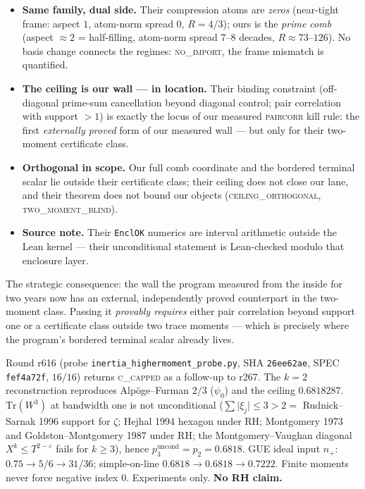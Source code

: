 \documentclass[11pt]{article}
\theoremstyle{definition}
\theoremstyle{remark}
\begin{document}
\begin{itemize}[leftmargin=2em]
\item \textbf{Same family, dual side.}  Their compression atoms are
\emph{zeros} (near-tight frame: aspect $1$, atom-norm spread $0$,
$R=4/3$); ours is the \emph{prime comb} (aspect $\approx2$ =
half-filling, atom-norm spread $7$--$8$ decades, $R\approx73$--$126$).
No basis change connects the regimes: \textsc{no\_import}, the frame
mismatch is quantified.
\item \textbf{The ceiling is our wall --- in location.}  Their binding
constraint (off-diagonal prime-sum cancellation beyond diagonal control;
pair correlation with support $>1$) is exactly the locus of our measured
\textsc{paircorr} kill rule: the first \emph{externally proved} form of
our measured wall --- but only for their two-moment certificate class.
\item \textbf{Orthogonal in scope.}  Our full comb coordinate and the
bordered terminal scalar lie outside their certificate class; their
ceiling does not close our lane, and their theorem does not bound our
objects (\textsc{ceiling\_orthogonal}, \textsc{two\_moment\_blind}).
\item \textbf{Source note.}  Their \texttt{EnclOK} numerics are interval
arithmetic outside the Lean kernel --- their unconditional statement is
Lean-checked modulo that enclosure layer.
\end{itemize}

The strategic consequence: the wall the program measured from the inside
for two years now has an external, independently proved counterpart in the
two-moment class.  Passing it \emph{provably requires} either pair
correlation beyond support one or a certificate class outside two trace
moments --- which is precisely where the program's bordered terminal
scalar already lives.

\noindent Round r616 (probe \texttt{inertia\_highermoment\_probe.py},
SHA \texttt{26ee62ae}, SPEC \texttt{fef4a72f}, $16/16$) returns
\textsc{c\_capped} as a follow-up to r267.  The $k=2$ reconstruction
reproduces Alp\"oge--Furman $2/3$ ($\psi_0$) and the ceiling
$0.6818287$.  $\mathrm{Tr}(W^3)$ at bandwidth one is not
unconditional ($\sum\lvert\xi_j\rvert\le 3>2=$ Rudnick--Sarnak 1996
support for $\zeta$; Hejhal 1994 hexagon under RH; Montgomery 1973 and
Goldston--Montgomery 1987 under RH; the Montgomery--Vaughan diagonal
$X^k\le T^{2-\varepsilon}$ fails for $k\ge 3$), hence
$p_3^{\mathrm{uncond}}=p_2=0.6818$.  GUE ideal input $n_+$:
$0.75\to 5/6\to 31/36$; simple-on-line $0.6818\to 0.6818\to 0.7222$.
Finite moments never force negative index $0$.  Experiments only.
\textbf{No RH claim.}
\end{document}

